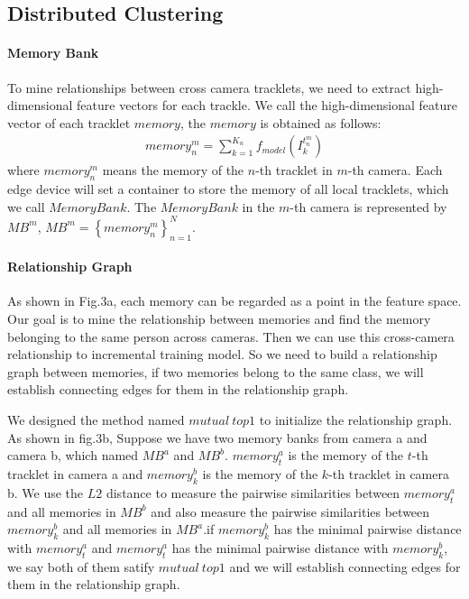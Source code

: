 \documentclass{article}
\begin{document}
\subsection{Distributed Clustering}
\paragraph{Memory Bank}To mine relationships between cross camera tracklets, we need to extract high-dimensional feature vectors for each trackle. We call the high-dimensional feature vector of each tracklet $memory$, the $memory$ is obtained as follows:
\begin{equation}
\begin{aligned}
memory_{n}^{m} = \sum_{k=1}^{K_{n}}f_{model}(I_{k}^{t_{n}^{m}})
\end{aligned}
\end{equation}
where $memory_{n}^{m}$ means the memory of the $n$-th tracklet in $m$-th camera. Each edge device will set a container to store the memory of all local tracklets, which we call $Memory Bank$. The $Memory Bank$ in the $m$-th camera is represented by $MB^{m}$, $MB^{m} = \left \{ memory_{n}^{m} \right \}_{n=1}^{N}$.
\paragraph{Relationship Graph}As shown in Fig.3a, each memory can be regarded as a point in the feature space. Our goal is to mine the relationship between memories and find the memory belonging to the same person across cameras. Then we can use this cross-camera relationship to incremental training model. So we need to build a relationship graph between memories, if two memories belong to the same class, we will establish connecting edges for them in the relationship graph.


We designed the method named $mutual \ top1$ to initialize the relationship graph. As shown in fig.3b, Suppose we have two memory banks from camera a and camera b, which named $MB^{a}$ and $MB^{b}$. $memory_{t}^{a}$ is the memory of the $t$-th tracklet in camera a and $memory_{k}^{b}$ is the memory of the $k$-th tracklet in camera b. We use the $L2$ distance to measure the pairwise similarities between $memory_{t}^{a}$ and all memories in $MB^{b}$ and also measure the pairwise similarities between $memory_{k}^{b}$ and all memories in $MB^{a}$.if $memory_{k}^{b}$ has the  minimal pairwise distance with $memory_{t}^{a}$ and  $memory_{t}^{a}$ has the minimal pairwise distance with $memory_{k}^{b}$, we say both of them satify $mutual \ top1$ and we will establish connecting edges for them in the relationship graph.
\end{document}
